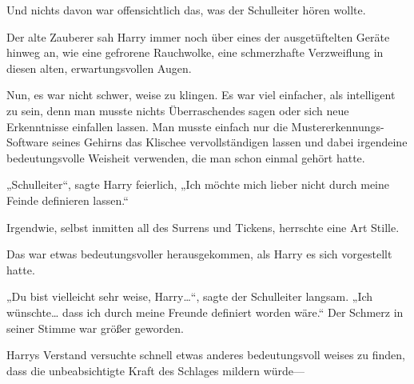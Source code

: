 Und nichts davon war offensichtlich das, was der Schulleiter hören wollte.

Der alte Zauberer sah Harry immer noch über eines der ausgetüftelten Geräte hinweg an, wie eine gefrorene Rauchwolke, eine schmerzhafte Verzweiflung in diesen alten, erwartungsvollen Augen.

Nun, es war nicht schwer, weise zu klingen. Es war viel einfacher, als intelligent zu sein, denn man musste nichts Überraschendes sagen oder sich neue Erkenntnisse einfallen lassen. Man musste einfach nur die Mustererkennungs-Software seines Gehirns das Klischee vervollständigen lassen und dabei irgendeine bedeutungsvolle Weisheit verwenden, die man schon einmal gehört hatte.

„Schulleiter“, sagte Harry feierlich, „Ich möchte mich lieber nicht durch meine Feinde definieren lassen.“

Irgendwie, selbst inmitten all des Surrens und Tickens, herrschte eine Art Stille.

Das war etwas bedeutungsvoller herausgekommen, als Harry es sich vorgestellt hatte.

„Du bist vielleicht sehr weise, Harry…“, sagte der Schulleiter langsam. „Ich wünschte… dass ich durch meine Freunde definiert worden wäre.“ Der Schmerz in seiner Stimme war größer geworden.

Harrys Verstand versuchte schnell etwas anderes bedeutungsvoll weises zu finden, dass die unbeabsichtigte Kraft des Schlages mildern würde—

